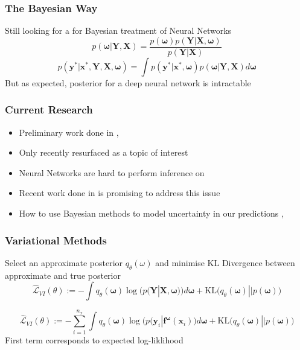 \documentclass{beamer}
\newcommand{\mb}[1]{\mathbf{#1}}
\begin{document}
% 
% 
% 
% 
\begin{frame}
  \frametitle{The Bayesian Way}
  Still looking for a for Bayesian treatment of Neural Networks
  \begin{equation*}
    p(\mb{\omega}|\mb{Y}, \mb{X}) = \dfrac{p(\mb{\omega}) p(\mb{Y}|\mb{X}, \mb{\omega})}{p(\mb{Y}|\mb{X})}
  \end{equation*}
  \vspace*{0.5cm}
  \begin{equation*}
    p(\mb{y}^* |\mb{x}^*, \mb{Y}, \mb{X}, \mb{\omega}) = 
    \int p(\mb{y}^* |\mb{x}^*, \mb{\omega}) p(\mb{\omega}|\mb{Y}, \mb{X}) d\mb{\omega}
  \end{equation*}
  But as expected, posterior for a deep neural network is intractable
\end{frame}
% 
% 
% 
% 
% 
\begin{frame}
  \frametitle{Current Research}
  \begin{itemize}
  \item Preliminary work done in \cite{Neal1996}, \cite{mackay1992}
  \item Only recently resurfaced as a topic of interest
  \item Neural Networks are hard to perform inference on
  \item Recent work done in \cite{graves2011} is promising to address this issue
  \item How to use Bayesian methods to model uncertainty in our predictions \cite{kingma2015}, \cite{gal2016}
  \end{itemize}  
\end{frame}
% 
% 
% 
% 
\begin{frame}
  \frametitle{Variational Methods}
  Select an approximate posterior $q_\theta(\omega)$ and minimise KL Divergence between approximate and true posterior
  \begin{equation*}
    \hat{\mathcal{L}}_{VI}(\theta) := - \int q_\theta (\mb{\omega})
    \log\Big( p(\mb{Y} | \mb{X}, \mb{\omega}) \Big) d\mb{\omega} +
    \text{KL}\Big( q_\theta (\mb{\omega}) || p (\mb{\omega}) \Big)
  \end{equation*}
  
  \begin{equation*}
    \hat{\mathcal{L}}_{VI}(\theta) := - \sum_{i=1}^{n_x}\int q_\theta (\mb{\omega})
    \log\Big( p(\mb{y}_i | \mb{f}^{\mb{\omega}}(\mb{x}_i) \Big) d\mb{\omega} +
    \text{KL}\Big( q_\theta (\mb{\omega}) || p (\mb{\omega}) \Big)
  \end{equation*}
  First term corresponds to expected log-liklihood
\end{frame}
\end{document}
